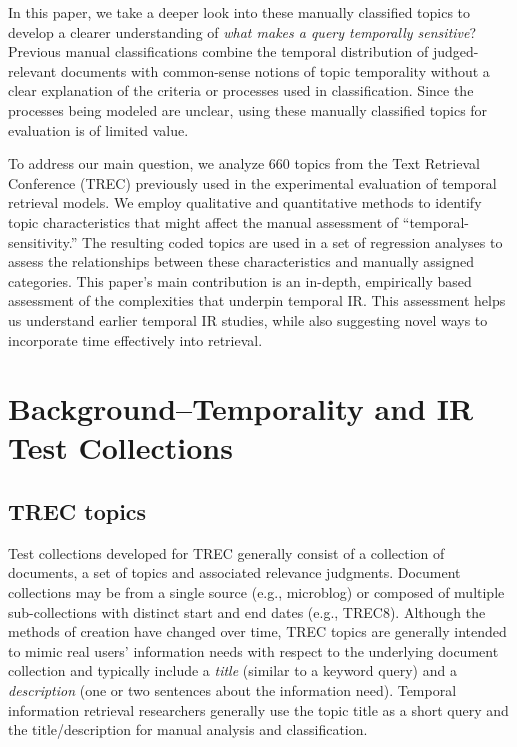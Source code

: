 \documentclass{sig-alternate}
\begin{document}
In this paper, we take a deeper look into these manually classified topics to develop a clearer understanding of \emph{what makes a query temporally sensitive}?  Previous manual classifications combine the temporal distribution of judged-relevant documents with common-sense notions of topic temporality without a clear explanation of the criteria or processes used in classification. Since the processes being modeled are unclear, using these manually classified topics for evaluation is of limited value. 

To address our main question, we analyze  660 topics from the Text Retrieval Conference (TREC) previously used in the experimental evaluation of temporal retrieval models. We employ qualitative and quantitative methods to identify topic characteristics that might affect the manual assessment of ``temporal-sensitivity.'' The resulting coded topics are used in a set of regression analyses to assess the relationships between these characteristics and manually assigned categories.   This paper's main contribution is an in-depth, empirically based assessment of the complexities that underpin temporal IR.  This assessment helps us understand earlier temporal IR studies, while also suggesting novel ways to incorporate time effectively into retrieval.

\section{Background--Temporality and IR Test Collections}

\subsection{TREC topics}

Test collections developed for TREC generally consist of a collection of documents, a set of topics and associated relevance judgments. Document collections may be from a single source (e.g., microblog) or composed of multiple sub-collections with distinct start and end dates (e.g., TREC8).  Although the methods of creation have changed over time, TREC topics are generally intended to mimic real users' information needs with respect to the underlying document collection and typically include a \textit{title} (similar to a keyword query) and a \textit{description} (one or two sentences about the information need).  Temporal information retrieval researchers generally use the topic title as a short query and the title/description for manual analysis and classification.
\end{document}
